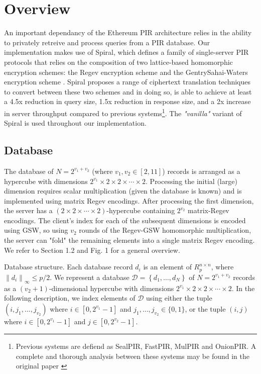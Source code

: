 \section{Overview}

An important dependancy of the Ethereum PIR architecture relies in the ability to
privately retreive and process queries from a PIR database. Our implementation makes use
of
Spiral, which defines a family of single-server PIR protocols that relies on the
composition of two lattice-based homomorphic encryption schemes: the Regev encryption
scheme and the GentrySahai-Waters encryption scheme \cite{1}. Spiral proposes a range of
ciphertext translation techniques to convert between these two schemes and in doing so, is
able to achieve at least a 4.5x reduction in query size, 1.5x reduction in response size,
and a 2x increase in server throughput compared to previous systems\footnote{Previous
systems are defiend as SealPIR, FastPIR, MulPIR and OnionPIR. A complete and thorough
analysis between these systems may be found in the original paper \cite{1}}. The
\textit{"vanilla"} variant of Spiral is used throughout our implementation.

\subsection{Database}

The database of $N=2^{v_{1}+v_{2}}$ (where $v_{1}, v_{2} \in[2,11]$) records is arranged as a hypercube with dimensions
$2^{v_{1}} \times 2 \times 2 \times \cdots \times 2$. Processing the initial (large)
dimension requires scalar multiplication (given the database is known) and is implemented using matrix Regev
encodings. After processing the first dimension, the server has a $(2 \times 2 \times
\cdots \times 2)$-hypercube containing $2^{v_{2}}$ matrix-Regev encodings. The client's
index for each of the subsequent dimensions is encoded using GSW, so using $v_{2}$ rounds
of the Regev-GSW homomorphic multiplication, the server can "fold" the remaining elements
into a single matrix Regev encoding. We refer to Section 1.2 and Fig. 1 for a general
overview.

Database structure. Each database record $d_{i}$ is an element of $R_{p}^{n \times n}$, where $\left\|d_{i}\right\|_{\infty} \leq p / 2$. We represent a database $\mathcal{D}=\left\{d_{1}, \ldots, d_{N}\right\}$ of $N=2^{v_{1}+v_{2}}$ records as a $\left(v_{2}+1\right)$-dimensional hypercube with dimensions $2^{v_{1}} \times 2 \times 2 \times \cdots \times 2$. In the following description, we index elements of $\mathcal{D}$ using either the tuple $\left(i, j_{1}, \ldots, j_{v_{2}}\right)$ where $i \in\left[0,2^{v_{1}}-1\right]$ and $j_{1}, \ldots, j_{v_{2}} \in\{0,1\}$, or the tuple $(i, j)$ where $i \in\left[0,2^{v_{1}}-1\right]$ and $j \in\left[0,2^{v_{2}}-1\right]$.

